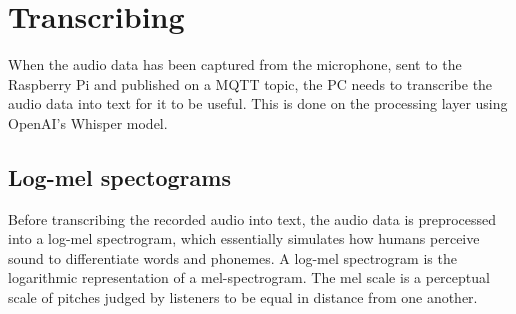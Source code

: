 \section{Transcribing}





When the audio data has been captured from the microphone, sent to the Raspberry Pi and published on a MQTT topic, the PC needs to transcribe the audio data into text for it to be useful. This is done on the processing layer using OpenAI's Whisper model.\cite{whisper_paper} 

\subsection{Log-mel spectograms}
Before transcribing the recorded audio into text, the audio data is preprocessed into a log-mel spectrogram, which essentially simulates how humans perceive sound to differentiate words and phonemes. A log-mel spectrogram is the logarithmic representation of a mel-spectrogram. The mel scale is a perceptual scale of pitches judged by listeners to be equal in distance from one another. 

